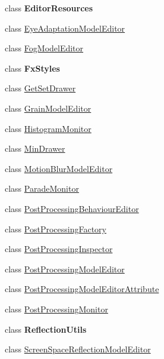 \begin{DoxyCompactItemize}
class {\bfseries Editor\+Resources}
\item 
class \hyperlink{class_unity_editor_1_1_post_processing_1_1_eye_adaptation_model_editor}{Eye\+Adaptation\+Model\+Editor}
\item 
class \hyperlink{class_unity_editor_1_1_post_processing_1_1_fog_model_editor}{Fog\+Model\+Editor}
\item 
class {\bfseries Fx\+Styles}
\item 
class \hyperlink{class_unity_editor_1_1_post_processing_1_1_get_set_drawer}{Get\+Set\+Drawer}
\item 
class \hyperlink{class_unity_editor_1_1_post_processing_1_1_grain_model_editor}{Grain\+Model\+Editor}
\item 
class \hyperlink{class_unity_editor_1_1_post_processing_1_1_histogram_monitor}{Histogram\+Monitor}
\item 
class \hyperlink{class_unity_editor_1_1_post_processing_1_1_min_drawer}{Min\+Drawer}
\item 
class \hyperlink{class_unity_editor_1_1_post_processing_1_1_motion_blur_model_editor}{Motion\+Blur\+Model\+Editor}
\item 
class \hyperlink{class_unity_editor_1_1_post_processing_1_1_parade_monitor}{Parade\+Monitor}
\item 
class \hyperlink{class_unity_editor_1_1_post_processing_1_1_post_processing_behaviour_editor}{Post\+Processing\+Behaviour\+Editor}
\item 
class \hyperlink{class_unity_editor_1_1_post_processing_1_1_post_processing_factory}{Post\+Processing\+Factory}
\item 
class \hyperlink{class_unity_editor_1_1_post_processing_1_1_post_processing_inspector}{Post\+Processing\+Inspector}
\item 
class \hyperlink{class_unity_editor_1_1_post_processing_1_1_post_processing_model_editor}{Post\+Processing\+Model\+Editor}
\item 
class \hyperlink{class_unity_editor_1_1_post_processing_1_1_post_processing_model_editor_attribute}{Post\+Processing\+Model\+Editor\+Attribute}
\item 
class \hyperlink{class_unity_editor_1_1_post_processing_1_1_post_processing_monitor}{Post\+Processing\+Monitor}
\item 
class {\bfseries Reflection\+Utils}
\item 
class \hyperlink{class_unity_editor_1_1_post_processing_1_1_screen_space_reflection_model_editor}{Screen\+Space\+Reflection\+Model\+Editor}
\item 

\end{DoxyCompactItemize}

